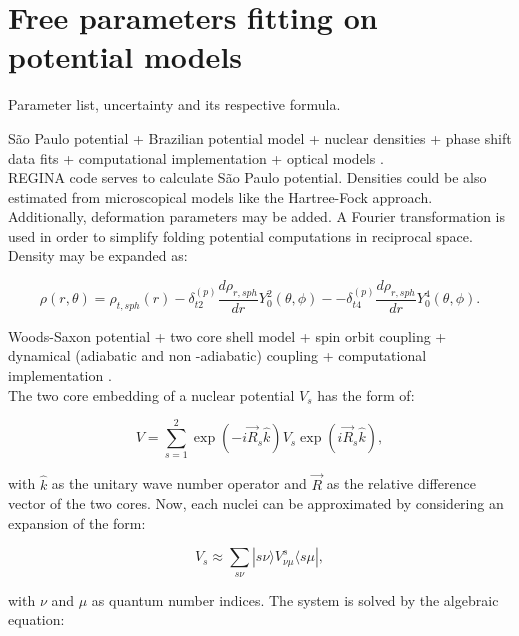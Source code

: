 \documentclass[openany]{book}
\begin{document}
\section{Free parameters fitting on potential models} \label{sec:potentialFitting}

Parameter list, uncertainty and its respective formula.

São Paulo potential + Brazilian potential model + nuclear densities + phase shift data fits + computational implementation + optical models \cite{chamon_carlson_gasques_2021}. \\

\textsc{REGINA} code serves to calculate São Paulo potential. Densities could be also estimated from microscopical models like the Hartree-Fock approach. Additionally, deformation parameters may be added. A Fourier transformation is used in order to simplify folding potential computations in reciprocal space. Density may be expanded as: 

\begin{equation}\label{eq:potentialNumerical_SaoPablo_densities}
	\rho(r, \theta) = \rho_{t, sph}(r) - \delta^{(p)}_{t2} \frac{d\rho_{r, sph}}{dr} Y^{2}_{0}(\theta, \phi) - - \delta^{(p)}_{t4} \frac{d\rho_{r, sph}}{dr} Y^{4}_{0}(\theta, \phi).
\end{equation}

Woods-Saxon potential + two core shell model + spin orbit coupling +  dynamical (adiabatic and non -adiabatic) coupling  + computational implementation \cite{diaz-torres_2018}. \\

The two core embedding of a nuclear potential $V_s$ has the form of: 

\begin{equation}\label{potentialNumerical_TCSM_V}
	V = \sum_{s=1}^{2} {\exp{(-i\vec R_s \hat k)} V_s \exp{(i\vec R_s \hat k)} },
\end{equation}

with $\hat k$ as the unitary wave number operator and $\vec R$ as the relative difference vector of the two cores. Now, each nuclei can be approximated by considering an expansion of the form:

\begin{equation}\label{potentialNumerical_TCSM_V_s}
	V_s \approx \sum_{s\nu} |s\nu \rangle V^{s}_{\nu \mu} \langle s \mu |, 
\end{equation}

with $\nu$ and $\mu$ as quantum number indices. The system is solved by the algebraic equation:
\end{document}
